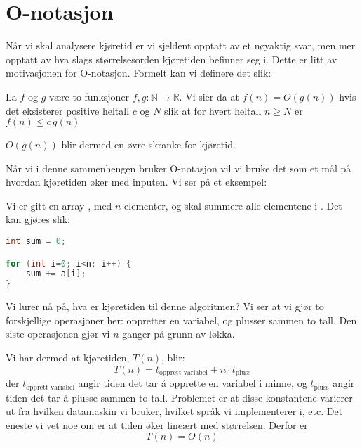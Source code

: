 \section{O-notasjon}
Når vi skal analysere kjøretid er vi sjeldent opptatt av et nøyaktig svar, men mer opptatt av hva slags størrelsesorden kjøretiden befinner seg i. Dette er litt av motivasjonen for O-notasjon. Formelt kan vi definere det slik:

\begin{definition}
\label{def:O}
La $ f $ og $ g $ være to funksjoner $ f, g\colon\mathbb{N} \rightarrow \mathbb{R} $. Vi sier da at $ f(n) = O(g(n))$ hvis det eksisterer positive heltall $ c $ og $ N $ slik at for hvert heltall $ n\geq N $ er $ f(n) \leq c\,g(n) $
\end{definition}
$ O(g(n)) $ blir dermed en øvre skranke for kjøretid.

Når vi i denne sammenhengen bruker O-notasjon vil vi bruke det som et mål på hvordan kjøretiden øker med inputen. Vi ser på et eksempel:

\begin{example}
Vi er gitt en array , med $ n $ elementer, og skal summere alle elementene i . Det kan gjøres slik:
\begin{lstlisting}[language=Java,
commentstyle=\color{source_brown}\monofontitalic, 
morekeywords={String},
keywordstyle=\color{source_blue}\monofontbold,
stringstyle=\color{source_orange}]
int sum = 0;

for (int i=0; i<n; i++) {
	sum += a[i];
}
\end{lstlisting}
Vi lurer nå på, hva er kjøretiden til denne algoritmen? Vi ser at vi gjør to forskjellige operasjoner her: oppretter en variabel, og plusser sammen to tall. Den siste operasjonen gjør vi $ n $ ganger på grunn av løkka.

Vi har dermed at kjøretiden, $ T(n) $, blir:
\[ T(n) = t_{\text{opprett variabel}} + n \cdot t_{\text{pluss}}  \]
der $ t_{\text{opprett variabel}} $ angir tiden det tar å opprette en variabel i minne, og $ t_{\text{pluss}} $ angir tiden det tar å plusse sammen to tall. Problemet er at disse konstantene varierer ut fra hvilken datamaskin vi bruker, hvilket språk vi implementerer i, etc. Det eneste vi vet noe om er at tiden øker lineært med størrelsen. Derfor er 
\[ T(n) = O(n) \]
\end{example}

